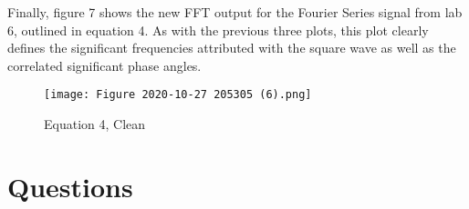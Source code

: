 \documentclass[12pt, titlepage]{article}
\begin{document}
    \clearpage
    Finally, figure 7 shows the new FFT output for the Fourier Series signal from lab 6, outlined in equation 4.  As with the previous three plots, this plot clearly defines the significant frequencies attributed with the square wave as well as the correlated significant phase angles.
    
     \begin{figure}[h!]
        \centering
        \texttt{[image: Figure 2020-10-27 205305 (6).png]}
        \caption{Equation 4, Clean}
        \label{fig:my_label}
    \end{figure}
    \clearpage
   
    
    \section{Questions}
\end{document}
